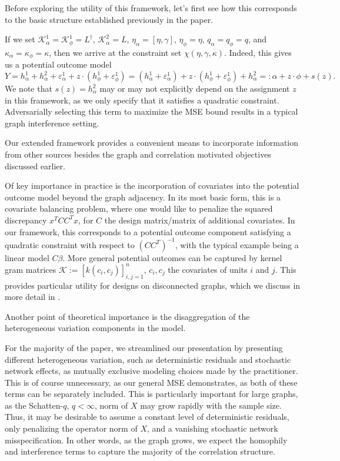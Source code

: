 \documentclass[12pt]{article}
\theoremstyle{definition}
\numberwithin{equation}{section}
\numberwithin{figure}{section}
\newcommand{\calK}{{\mathcal K}}
\numberwithin{equation}{section}
\numberwithin{figure}{section}
\begin{document}
Before exploring the utility of this framework, let's first see how this corresponds to the basic structure established previously in the paper.
\begin{example}
    If we set $\calK_\alpha^1 = \calK_\phi^1 = L^\dagger$, $\calK_\alpha^2= L$, $\eta_\alpha = [\eta, \gamma]$, $\eta_\phi = \eta$, $q_\alpha = q_\phi = q$, and $\kappa_\alpha = \kappa_\phi = \kappa$, then we arrive at the constraint set $\chi(\eta,\gamma, \kappa)$. Indeed, this gives us a potential outcome model
    \[
    Y = h_\alpha^1 + h_\alpha^2 + \varepsilon_\alpha^1 + z \cdot \left(h_\phi^1 + \varepsilon_\phi^1\right) = (h_\alpha^1 + \varepsilon_\alpha^1) + z \cdot \left(h_\phi^1 + \varepsilon_\phi^1\right) + h_\alpha^2 =: \alpha + z\cdot \phi + s(z).
    \]
    We note that $s(z)=h_\alpha^2$ may or may not explicitly depend on the assignment $z$ in this framework, as we only specify that it satisfies a quadratic constraint. Adversarially selecting this term to maximize the MSE bound results in a typical graph interference setting.
\end{example}
Our extended framework provides a convenient means to incorporate information from other sources besides the graph and correlation motivated objectives discussed earlier. 

\begin{example}
    Of key importance in practice is the incorporation of covariates into the potential outcome model beyond the graph adjacency. In its most basic form, this is a covariate balancing problem, where one would like to penalize the squared discrepancy $x^T CC^T x$, for $C$ the design matrix/matrix of additional covariates. In our framework, this corresponds to a potential outcome component satisfying a quadratic constraint with respect to $(CC^T)^{-1}$, with the typical example being a linear model $C \beta$. More general potential outcomes can be captured by kernel gram matrices $\calK := [k(c_i, c_j)]_{i, j=1}^n$, $c_i, c_j$ the covariates of units $i$ and $j$. This provides particular utility for designs on disconnected graphs, which we discuss in more detail in .
\end{example}

Another point of theoretical importance is the disaggregation of the heterogeneous variation components in the model.

\begin{example}
    For the majority of the paper, we streamlined our presentation by presenting different heterogeneous variation, such as deterministic residuals and stochastic network effects, as mutually exclusive modeling choices made by the practitioner. 
    This is of course unnecessary, as our general MSE demonstrates, as both of these terms can be separately included. 
    This is particularly important for large graphs, as the Schatten-$q$, $q < \infty$, norm of $X$ may grow rapidly with the sample size. Thus, it may be desirable to assume a constant level of deterministic residuals, only penalizing the operator norm of $X$, and a vanishing stochastic network misspecification. In other words, as the graph grows, we expect the homophily and interference terms to capture the majority of the correlation structure.
\end{example}
\end{document}

